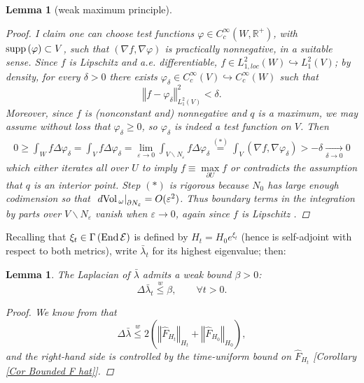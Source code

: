 \documentclass{article}
\newcommand{\func}[1]{\textnormal {#1\,}}
\newcommand{\R}{\mathbb{R}}
\newcommand{\wleq}{\overset{w}{\leq}}
\newcommand{\bl}{\bar\lambda}
\newcommand{\dvol}{\:d\func{Vol}_\omega}
\newtheorem{lemma}[theorem]{Lemma}
\begin{document}
\begin{lemma}[weak maximum principle]
\begin{proof}
I claim one can choose  test functions  $\varphi\in C^\infty_c(W,\R^+)$,  with $\func{supp}(\varphi)\subset V$, such that  $\left(\nabla f,\nabla\varphi\right)$ is  practically nonnegative, in a suitable sense. Since $f$ is Lipschitz and a.e. differentiable, $f\in L^2_{1,loc}(W)\hookrightarrow L^2_1(V)$; by density, for every $\delta>0$ there exists $\varphi_\delta\in C^\infty_c(V)\hookrightarrow C^\infty_c(W)$ such that 
$$
\left\Vert f-\varphi_\delta\right\Vert^2_{L^2_1(V)}<\delta.
$$
Moreover, since $f$ is (nonconstant and) nonnegative and $q$ is a maximum, we may assume without loss that $\varphi_\delta\geq0$, so $\varphi_\delta$ is indeed a test function on $V$. Then 
\begin{eqnarray*}
        0\geq \int_W f\Delta\varphi_\delta
        =\int_V f\Delta\varphi_\delta
        =\lim_{\varepsilon\to0}\int_{V\smallsetminus N_\varepsilon}f\Delta\varphi_\delta
        \overset{(*)}{=} \int_V \left( \nabla f,\nabla\varphi_\delta \right)
        >-\delta
        \underset{\delta\to0}{\longrightarrow}0
\end{eqnarray*}
which either iterates all over $U$ to imply $f\equiv \max\limits_{\partial U} f$ or contradicts the assumption that $q$ is an interior point. Step $(*)$ is rigorous because $N_0$ has large enough codimension so that $\left.\dvol\right\vert_{\partial N_\varepsilon}=O(\varepsilon^2)$. Thus boundary terms in the integration by parts over $V\smallsetminus N_\varepsilon$ vanish when $\varepsilon\rightarrow 0$, again since $f$ is Lipschitz \cite[p.244]{inf dets stab bdls...}.
\end{proof}
\end{lemma}



Recalling that $\xi _{t}\in \Gamma \left( 
\func{End} \mathcal{E} \right) $ is defined by $H_{t}=H_{0}e^{\xi _{t}}$ (hence is self-adjoint with respect to both metrics), write $\bar{\lambda}_{t}$ for its highest eigenvalue; then:

\begin{lemma}           \label{Lemma Delta Lambda weakly bounded}
The Laplacian of $\bl$ admits a weak bound $\beta>0$:
\begin{displaymath}
        \Delta\bl_t \wleq \beta, \qquad\forall t>0. 
\end{displaymath}
\begin{proof}
We know from \cite[Lemma 25]{inf dets stab bdls...} that\begin{displaymath}
        \Delta\bl \wleq 
        2 \left( \left\Vert \hat{F}_{H_t} \right\Vert_{H_t} 
        + \left\Vert \hat{F}_{H_0} \right\Vert_{H_0}\right),
\end{displaymath}
and the right-hand side is controlled by the time-uniform bound on $\hat{F}_{H_t}$ [\emph{Corollary \ref{Cor Bounded F hat}}].
\end{proof}
\end{lemma}
\end{document}
